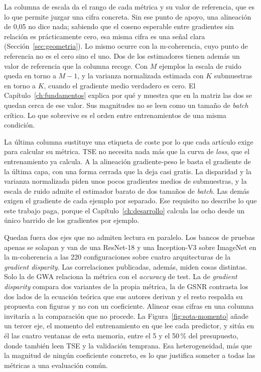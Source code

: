La columna de escala da el rango de cada métrica y su valor de referencia, que es lo que permite juzgar una cifra concreta. Sin ese punto de apoyo, una alineación de 0,05 no dice nada; sabiendo que el coseno esperable entre gradientes sin relación es prácticamente cero, esa misma cifra es una señal clara (Sección~\ref{sec:geometria}). Lo mismo ocurre con la m-coherencia, cuyo punto de referencia no es el cero sino el uno. Dos de los estimadores tienen además un valor de referencia que la columna recoge. Con $M$ ejemplos la escala de ruido queda en torno a $M - 1$, y la varianza normalizada estimada con $K$ submuestras en torno a $K$, cuando el gradiente medio verdadero es cero. El Capítulo~\ref{ch:fundamentos} explica por qué y muestra que en la matriz las dos se quedan cerca de ese valor. Sus magnitudes no se leen como un tamaño de \emph{batch} crítico. Lo que sobrevive es el orden entre entrenamientos de una misma condición.

La última columna sustituye una etiqueta de coste por lo que cada artículo exige para calcular su métrica. TSE no necesita nada más que la curva de \emph{loss}, que el entrenamiento ya calcula. A la alineación gradiente-peso le basta el gradiente de la última capa, con una forma cerrada que la deja casi gratis. La disparidad y la varianza normalizada piden unos pocos gradientes medios de submuestras, y la escala de ruido admite el estimador barato de dos tamaños de \emph{batch}. Las demás exigen el gradiente de cada ejemplo por separado. Ese requisito no describe lo que este trabajo paga, porque el Capítulo~\ref{ch:desarrollo} calcula las ocho desde un único barrido de los gradientes por ejemplo.

Quedan fuera dos ejes que no admiten lectura en paralelo. Los bancos de pruebas apenas se solapan y van de una ResNet-18 y una Inception-V3 sobre ImageNet en la m-coherencia a las 220 configuraciones sobre cuatro arquitecturas de la \emph{gradient disparity}. Las correlaciones publicadas, además, miden cosas distintas. Solo la de GWA relaciona la métrica con el \emph{accuracy} de test. La de \emph{gradient disparity} compara dos variantes de la propia métrica, la de GSNR contrasta los dos lados de la ecuación teórica que sus autores derivan y el resto respalda su propuesta con figuras y no con un coeficiente. Alinear esas cifras en una columna invitaría a la comparación que no procede. La Figura~\ref{fig:sota-momento} añade un tercer eje, el momento del entrenamiento en que lee cada predictor, y sitúa en él las cuatro ventanas de esta memoria, entre el 5 y el 50\,\% del presupuesto, donde también leen TSE y la validación temprana. Esa heterogeneidad, más que la magnitud de ningún coeficiente concreto, es lo que justifica someter a todas las métricas a una evaluación común.

